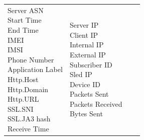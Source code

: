 \begin{description}
\begin{longtable}{p{}|p{}|p{}|p{}}
{                                                            Server ASN\\
                                                            Start Time\\
                                                            End Time\\
                                                            IMEI\\
                                                            IMSI\\
                                                            Phone Number\\
                                                            Application Label\\
                                                            Http.Host\\
                                                            Http.Domain\\
                                                            Http.URL\\
                                                            SSL.SNI\\
                                                            SSL.JA3 hash\\
                                                            Receive Time}
                                            &   \tabincell{l}{Server IP\\
                                                                            Client IP\\
                                                                            Internal IP\\
                                                                            External IP\\
                                                                            Subscriber ID\\
                                                                            Sled IP\\
                                                                            Device ID\\
                                                                            Packets Sent\\
                                                                            Packets Received\\
                                                                            Bytes Sent\\
}
\end{longtable}
\end{description}
